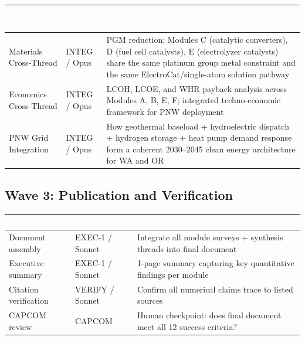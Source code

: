\documentclass[11pt,letterpaper]{article}
\newcommand{\tableheader}[1]{\textbf{\sffamily\textcolor{white}{#1}}}
\begin{document}
\begin{center}
\begin{tabularx}{\textwidth}{L{3.5cm}L{2.5cm}X}
\toprule
{}
\tableheader{Cross-Thread} & \tableheader{Agent} & \tableheader{Connection} \\
\midrule
Materials Cross-Thread & INTEG / Opus & PGM reduction: Modules C (catalytic converters), D (fuel cell catalysts), E (electrolyzer catalysts) share the same platinum group metal constraint and the same ElectroCat/single-atom solution pathway \\
Economics Cross-Thread & INTEG / Opus & LCOH, LCOE, and WHR payback analysis across Modules A, B, E, F; integrated techno-economic framework for PNW deployment \\
PNW Grid Integration & INTEG / Opus & How geothermal baseload + hydroelectric dispatch + hydrogen storage + heat pump demand response form a coherent 2030--2045 clean energy architecture for WA and OR \\
\bottomrule
\end{tabularx}
\end{center}

\subsection{Wave 3: Publication and Verification}

\begin{center}
\begin{tabularx}{\textwidth}{L{3.5cm}L{2.5cm}X}
\toprule
{}
\tableheader{Task} & \tableheader{Agent} & \tableheader{Details} \\
\midrule
Document assembly & EXEC-1 / Sonnet & Integrate all module surveys + synthesis threads into final document \\
Executive summary & EXEC-1 / Sonnet & 1-page summary capturing key quantitative findings per module \\
Citation verification & VERIFY / Sonnet & Confirm all numerical claims trace to listed sources \\
CAPCOM review & CAPCOM & Human checkpoint: does final document meet all 12 success criteria? \\
\bottomrule
\end{tabularx}
\end{center}
\end{document}
